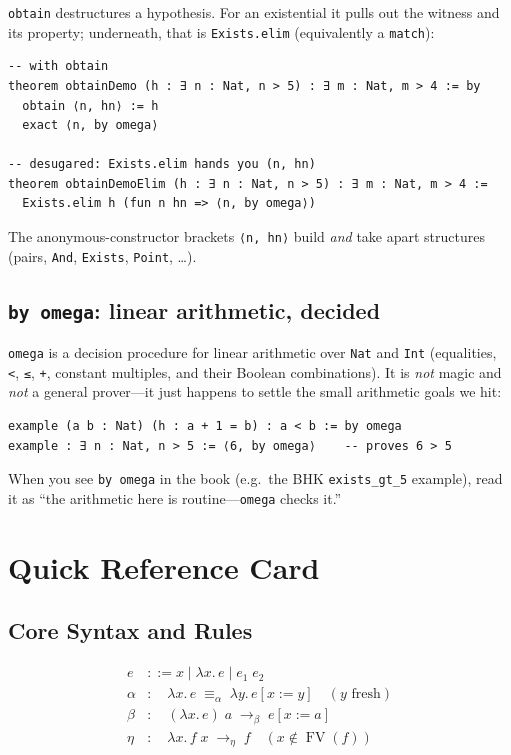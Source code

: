 \documentclass[11pt,a4paper]{article}
\theoremstyle{definition}
\newcommand{\lam}{\lambda}
\newcommand{\reduce}{\longrightarrow_\beta}
\newcommand{\ef}{\longrightarrow_\eta}
\newcommand{\aeq}{\equiv_\alpha}
\newcommand{\FV}{\operatorname{FV}}
\begin{document}
\texttt{obtain} destructures a hypothesis. For an existential it pulls out the
witness and its property; underneath, that is \texttt{Exists.elim} (equivalently
a \texttt{match}):

\begin{verbatim}
-- with obtain
theorem obtainDemo (h : ∃ n : Nat, n > 5) : ∃ m : Nat, m > 4 := by
  obtain ⟨n, hn⟩ := h
  exact ⟨n, by omega⟩

-- desugared: Exists.elim hands you (n, hn)
theorem obtainDemoElim (h : ∃ n : Nat, n > 5) : ∃ m : Nat, m > 4 :=
  Exists.elim h (fun n hn => ⟨n, by omega⟩)
\end{verbatim}

The anonymous-constructor brackets \verb|⟨n, hn⟩| build \emph{and} take apart
structures (pairs, \texttt{And}, \texttt{Exists}, \texttt{Point}, \ldots).

\subsection*{\texttt{by omega}: linear arithmetic, decided}

\texttt{omega} is a decision procedure for linear arithmetic over \texttt{Nat}
and \texttt{Int} (equalities, \verb|<|, \verb|≤|, \texttt{+}, constant multiples,
and their Boolean combinations). It is \emph{not} magic and \emph{not} a general
prover---it just happens to settle the small arithmetic goals we hit:

\begin{verbatim}
example (a b : Nat) (h : a + 1 = b) : a < b := by omega
example : ∃ n : Nat, n > 5 := ⟨6, by omega⟩    -- proves 6 > 5
\end{verbatim}

When you see \texttt{by omega} in the book (e.g.\ the BHK \texttt{exists\_gt\_5}
example), read it as ``the arithmetic here is routine---\texttt{omega} checks
it.''

\newpage
\section{Quick Reference Card}\label{app:ref}

\subsection*{Core Syntax and Rules}
\vspace{-0.5em}
\begin{align*}
  e &::= x \mid \lam x.\, e \mid e_1\; e_2 \\
  \alpha &:\quad \lam x.\, e \;\aeq\; \lam y.\, e[x := y] \quad(y \text{ fresh}) \\
  \beta &:\quad (\lam x.\, e)\; a \;\reduce\; e[x := a] \\
  \eta &:\quad \lam x.\, f\; x \;\ef\; f \quad(x \notin \FV(f))
\end{align*}
\end{document}
